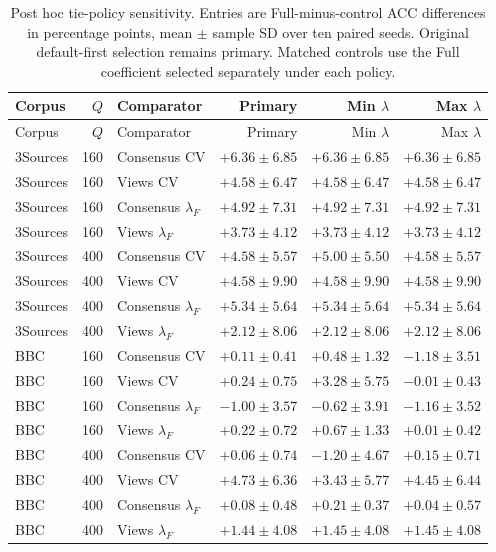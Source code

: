 \begingroup\small
\begin{longtable}{lrlrrr}
\caption{Post hoc tie-policy sensitivity. Entries are Full-minus-control ACC differences in percentage points, mean $\pm$ sample SD over ten paired seeds. Original default-first selection remains primary. Matched controls use the Full coefficient selected separately under each policy.}\label{tab:allocation-tie-sensitivity}\\
\toprule
Corpus & $Q$ & Comparator & Primary & Min $\lambda$ & Max $\lambda$\\
\midrule\endfirsthead
\toprule
Corpus & $Q$ & Comparator & Primary & Min $\lambda$ & Max $\lambda$\\
\midrule\endhead
\bottomrule\endfoot
3Sources & 160 & Consensus CV & $+6.36\pm6.85$ & $+6.36\pm6.85$ & $+6.36\pm6.85$\\
3Sources & 160 & Views CV & $+4.58\pm6.47$ & $+4.58\pm6.47$ & $+4.58\pm6.47$\\
3Sources & 160 & Consensus $\lambda_F$ & $+4.92\pm7.31$ & $+4.92\pm7.31$ & $+4.92\pm7.31$\\
3Sources & 160 & Views $\lambda_F$ & $+3.73\pm4.12$ & $+3.73\pm4.12$ & $+3.73\pm4.12$\\
3Sources & 400 & Consensus CV & $+4.58\pm5.57$ & $+5.00\pm5.50$ & $+4.58\pm5.57$\\
3Sources & 400 & Views CV & $+4.58\pm9.90$ & $+4.58\pm9.90$ & $+4.58\pm9.90$\\
3Sources & 400 & Consensus $\lambda_F$ & $+5.34\pm5.64$ & $+5.34\pm5.64$ & $+5.34\pm5.64$\\
3Sources & 400 & Views $\lambda_F$ & $+2.12\pm8.06$ & $+2.12\pm8.06$ & $+2.12\pm8.06$\\
BBC & 160 & Consensus CV & $+0.11\pm0.41$ & $+0.48\pm1.32$ & $-1.18\pm3.51$\\
BBC & 160 & Views CV & $+0.24\pm0.75$ & $+3.28\pm5.75$ & $-0.01\pm0.43$\\
BBC & 160 & Consensus $\lambda_F$ & $-1.00\pm3.57$ & $-0.62\pm3.91$ & $-1.16\pm3.52$\\
BBC & 160 & Views $\lambda_F$ & $+0.22\pm0.72$ & $+0.67\pm1.33$ & $+0.01\pm0.42$\\
BBC & 400 & Consensus CV & $+0.06\pm0.74$ & $-1.20\pm4.67$ & $+0.15\pm0.71$\\
BBC & 400 & Views CV & $+4.73\pm6.36$ & $+3.43\pm5.77$ & $+4.45\pm6.44$\\
BBC & 400 & Consensus $\lambda_F$ & $+0.08\pm0.48$ & $+0.21\pm0.37$ & $+0.04\pm0.57$\\
BBC & 400 & Views $\lambda_F$ & $+1.44\pm4.08$ & $+1.45\pm4.08$ & $+1.45\pm4.08$\\

\end{longtable}
